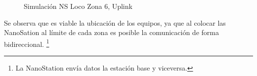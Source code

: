 \documentclass[12pt,a4paper]{book}
\begin{document}
\begin{figure}[H]
\centering
{} 
\caption{Simulación NS Loco Zona 6, Uplink}
\label{fig_SimulLoco6_acceso}
\end{figure}

Se observa que es viable la ubicación de los equipos, ya que al colocar las NanoSation al límite de cada zona es posible la comunicación de forma bidireccional. \footnote{ La NanoStation envía datos la estación base y viceversa.} \medskip
\end{document}
